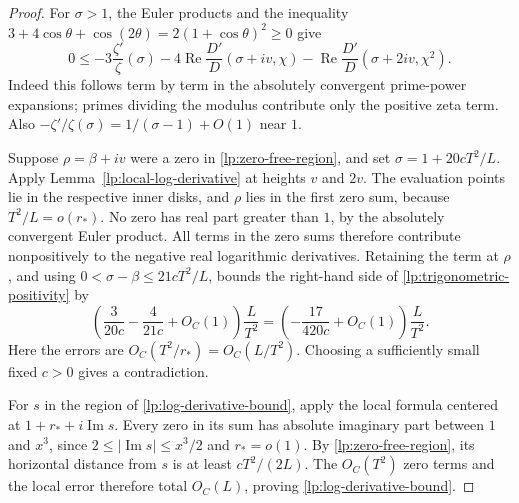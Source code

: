 \begin{proof}
For $\sigma>1$, the Euler products and the inequality
$3+4\cos\theta+\cos(2\theta)=2(1+\cos\theta)^2\ge0$ give
\begin{equation}\label{lp:trigonometric-positivity}
 0\le-3\frac{\zeta'}\zeta(\sigma)
       -4\operatorname{Re}\frac{D'}D(\sigma+iv,\chi)
       -\operatorname{Re}\frac{D'}D(\sigma+2iv,\chi^2).
\end{equation}
Indeed this follows term by term in the absolutely convergent
prime-power expansions; primes dividing the modulus contribute only
the positive zeta term.  Also
$-\zeta'/\zeta(\sigma)=1/(\sigma-1)+O(1)$ near $1$.

Suppose $\rho=\beta+iv$ were a zero in
\eqref{lp:zero-free-region}, and set
$\sigma=1+20cT^2/L$.  Apply
Lemma~\ref{lp:local-log-derivative} at heights $v$ and $2v$.
The evaluation points lie in the respective inner disks, and $\rho$
lies in the first zero sum, because $T^2/L=o(r_*)$.
No zero has real part greater than $1$, by the absolutely convergent
Euler product.  All terms in the zero sums therefore contribute
nonpositively to the negative real logarithmic derivatives.  Retaining
the term at $\rho$, and using
$0<\sigma-\beta\le21cT^2/L$, bounds the right-hand side of
\eqref{lp:trigonometric-positivity} by
\[
 \left(\frac{3}{20c}-\frac{4}{21c}+O_C(1)\right)\frac L{T^2}
 =\left(-\frac{17}{420c}+O_C(1)\right)\frac L{T^2}.
\]
Here the errors are $O_C(T^2/r_*)=O_C(L/T^2)$.
Choosing a sufficiently small fixed $c>0$ gives a contradiction.

For $s$ in the region of \eqref{lp:log-derivative-bound}, apply the
local formula centered at $1+r_*+i\operatorname{Im}s$.
Every zero in its sum has absolute imaginary part between $1$ and
$x^3$, since $2\le|\operatorname{Im}s|\le x^3/2$ and $r_*=o(1)$.
By \eqref{lp:zero-free-region}, its horizontal distance from $s$ is
at least $cT^2/(2L)$.  The $O_C(T^2)$ zero terms and the local error
therefore total $O_C(L)$, proving
\eqref{lp:log-derivative-bound}.
\end{proof}


